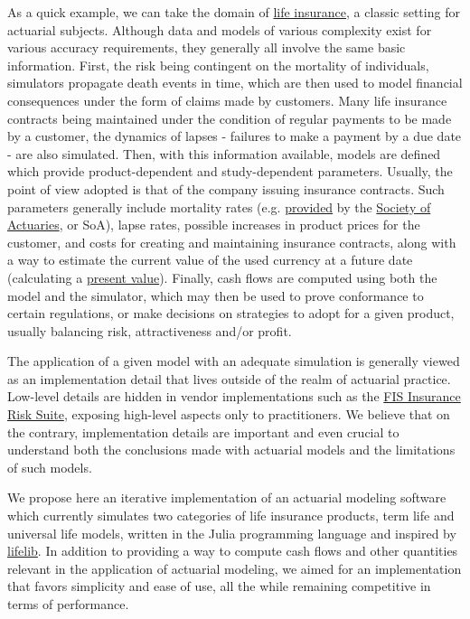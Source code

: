 \documentclass{article}
\begin{document}
As a quick example, we can take the domain of \hyperlink{https://en.wikipedia.org/wiki/Life_insurance}{life insurance}, a classic setting for actuarial subjects. Although data and models of various complexity exist for various accuracy requirements, they generally all involve the same basic information. First, the risk being contingent on the mortality of individuals, simulators propagate death events in time, which are then used to model financial consequences under the form of claims made by customers. Many life insurance contracts being maintained under the condition of regular payments to be made by a customer, the dynamics of lapses - failures to make a payment by a due date - are also simulated. Then, with this information available, models are defined which provide product-dependent and study-dependent parameters. Usually, the point of view adopted is that of the company issuing insurance contracts. Such parameters generally include mortality rates (e.g. \hyperlink{https://mort.soa.org/}{provided} by the \hyperlink{https://www.soa.org/}{Society of Actuaries}, or SoA), lapse rates, possible increases in product prices for the customer, and costs for creating and maintaining insurance contracts, along with a way to estimate the current value of the used currency at a future date (calculating a \hyperlink{https://en.wikipedia.org/wiki/Present_value}{present value}). Finally, cash flows are computed using both the model and the simulator, which may then be used to prove conformance to certain regulations, or make decisions on strategies to adopt for a given product, usually balancing risk, attractiveness and/or profit.

The application of a given model with an adequate simulation is generally viewed as an implementation detail  that lives outside of the realm of actuarial practice. Low-level details are hidden in vendor implementations such as the \hyperlink{https://www.fisglobal.com/en/products/fis-insurance-risk-suite}{FIS Insurance Risk Suite}, exposing high-level aspects only to practitioners. We believe that on the contrary, implementation details are important and even crucial to understand both the conclusions made with actuarial models and the limitations of such models.

We propose here an iterative implementation of an actuarial modeling software which currently simulates two categories of life insurance products, term life and universal life models, written in the Julia programming language \cite{Julia} and inspired by \hyperlink{https://github.com/lifelib-dev/lifelib}{lifelib}. In addition to providing a way to compute cash flows and other quantities relevant in the application of actuarial modeling, we aimed for an implementation that favors simplicity and ease of use, all the while remaining competitive in terms of performance.
\end{document}
